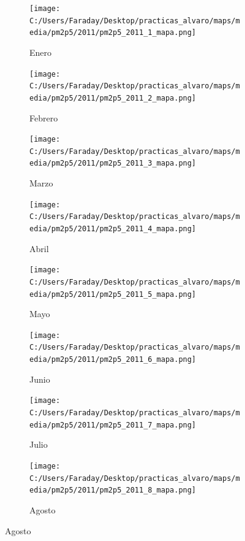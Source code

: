 \documentclass[12pt]{beamer}
\begin{document}
\begin{frame}[squeeze]
\tiny
\begin{figure}[H]
\centering
\begin{subfigure}[H]{0.20\textwidth}
\texttt{[image: C:/Users/Faraday/Desktop/practicas\_alvaro/maps/media/pm2p5/2011/pm2p5\_2011\_1\_mapa.png]}
\captionsetup{labelformat=empty}
\caption{\scriptsize Enero}
\label{fig:map-pm2p5-2011-1}
\end{subfigure}
%
\begin{subfigure}[H]{0.20\textwidth}
\texttt{[image: C:/Users/Faraday/Desktop/practicas\_alvaro/maps/media/pm2p5/2011/pm2p5\_2011\_2\_mapa.png]}
\captionsetup{labelformat=empty}
\caption{\scriptsize Febrero}
\label{fig:map-pm2p5-2011-2}
\end{subfigure}
%
\begin{subfigure}[H]{0.20\textwidth}
\texttt{[image: C:/Users/Faraday/Desktop/practicas\_alvaro/maps/media/pm2p5/2011/pm2p5\_2011\_3\_mapa.png]}
\captionsetup{labelformat=empty}
\caption{\scriptsize Marzo}
\label{fig:map-pm2p5-2011-3}
\end{subfigure}
%
\begin{subfigure}[H]{0.20\textwidth}
\texttt{[image: C:/Users/Faraday/Desktop/practicas\_alvaro/maps/media/pm2p5/2011/pm2p5\_2011\_4\_mapa.png]}
\captionsetup{labelformat=empty}
\caption{\scriptsize Abril}
\label{fig:map-pm2p5-2011-4}
\end{subfigure}

\begin{subfigure}[H]{0.20\textwidth}
\texttt{[image: C:/Users/Faraday/Desktop/practicas\_alvaro/maps/media/pm2p5/2011/pm2p5\_2011\_5\_mapa.png]}
\captionsetup{labelformat=empty}
\caption{\scriptsize Mayo}
\label{fig:map-pm2p5-2011-5}
\end{subfigure}
%
\begin{subfigure}[H]{0.20\textwidth}
\texttt{[image: C:/Users/Faraday/Desktop/practicas\_alvaro/maps/media/pm2p5/2011/pm2p5\_2011\_6\_mapa.png]}
\captionsetup{labelformat=empty}
\caption{\scriptsize Junio}
\label{fig:map-pm2p5-2011-6}
\end{subfigure}
%
\begin{subfigure}[H]{0.20\textwidth}
\texttt{[image: C:/Users/Faraday/Desktop/practicas\_alvaro/maps/media/pm2p5/2011/pm2p5\_2011\_7\_mapa.png]}
\captionsetup{labelformat=empty}
\caption{\scriptsize Julio}
\label{fig:map-pm2p5-2011-7}
\end{subfigure}
%
\begin{subfigure}[H]{0.20\textwidth}
\texttt{[image: C:/Users/Faraday/Desktop/practicas\_alvaro/maps/media/pm2p5/2011/pm2p5\_2011\_8\_mapa.png]}
\captionsetup{labelformat=empty}
\caption{\scriptsize Agosto}
\label{fig:map-pm2p5-2011-8}
\end{subfigure}


\end{figure}
\end{frame}
\end{document}
